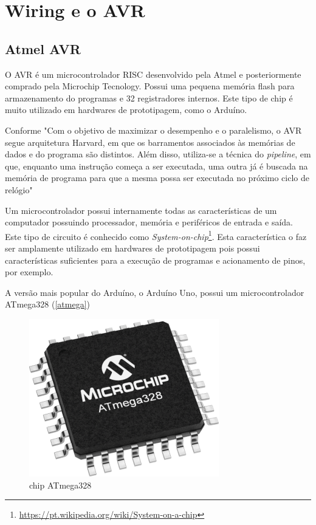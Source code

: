 \chapter{Wiring e o AVR}

\section{Atmel AVR}

O AVR é um microcontrolador RISC desenvolvido pela Atmel e posteriormente comprado pela Microchip Tecnology. Possui uma pequena memória flash para armazenamento do programas e 32 registradores internos. Este tipo de chip é muito utilizado em hardwares de prototipagem, como o Arduíno.

Conforme  "Com o objetivo de maximizar o desempenho e o paralelismo, o AVR segue arquitetura Harvard, em que os barramentos associados às memórias de dados e do programa são distintos. Além disso, utiliza-se a técnica do \emph{pipeline}, em que, enquanto uma instrução começa a ser executada, uma outra já é buscada na memória de programa para que a mesma possa ser executada no próximo ciclo de relógio"

Um microcontrolador possui internamente todas as características de um computador possuindo processador, memória e periféricos de entrada e saída. Este tipo de circuito é conhecido como \emph{System-on-chip}\footnote{\url{https://pt.wikipedia.org/wiki/System-on-a-chip}}. Esta característica o faz ser amplamente utilizado em hardwares de prototipagem pois possui características suficientes para a execução de programas e acionamento de pinos, por exemplo.

A versão mais popular do Arduíno, o Arduíno Uno, possui um microcontrolador ATmega328 (\autoref{atmega})

\begin{figure}[htb]
	\begin{center}
	    \includegraphics[scale=0.5]{artigo/refs/medium-ATmega328-TQFP-32.png}
	\end{center}
	\caption{\label{atmega}chip ATmega328}
\end{figure}

